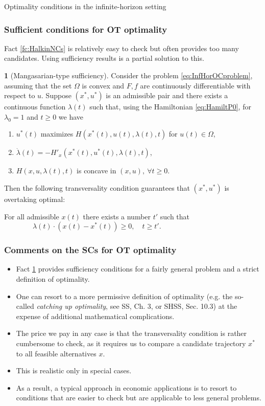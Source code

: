 \documentclass[10pt]{beamer}
\theoremstyle{definition}
\newtheorem{Fact}{\translate{Fact}}
\begin{document}
\begin{section}{Optimality conditions in the infinite-horizon setting}
\begin{frame}[fragile]
\frametitle{Sufficient conditions for OT optimality}
Fact \ref{fc:HalkinNCs} is relatively easy to check but often provides too many candidates. Using sufficiency results is a partial solution to this. \pause

\begin{Fact}[Mangasarian-type sufficiency]
Consider the problem \eqref{eq:InfHorOCproblem}, assuming that the set $ \Omega $ is convex and $ F,f $ are continuously differentiable with respect to $ u $. Suppose $ (x^*,u^*) $ is an admissible pair and there exists a continuous function $ \lambda(t) $ such that, using the Hamiltonian \eqref{eq:HamiltP0}, for $ \lambda_0=1 $ and $ t\geq 0 $ we have
\begin{enumerate}
\item $ u^*(t) $ maximizes $ H(x^*(t),u(t),\lambda(t),t )$ for $ u(t)\in \Omega $,
\item $ \dot{\lambda}(t) = -H'_x(x^*(t),u^*(t),\lambda(t),t) $,
\item $ H(x,u,\lambda(t),t ) $ is concave in $ (x,u),~\forall t \geq 0 $.
\end{enumerate}

Then the following transversality condition guarantees that $ (x^*,u^*) $ is overtaking optimal:

For all admissible $ x(t) $ there exists a number $ t' $ such that \newline
${} \qquad \qquad \lambda(t)\cdot (x(t)-x^*(t))\geq 0,\quad t\geq t'. $ 
\label{fc:SCsOT}
\end{Fact}
\end{frame}

\begin{frame}[fragile]
\frametitle{Comments on the SCs for OT optimality}
\begin{itemize}\itemsep1em
\item Fact \ref{fc:SCsOT} provides sufficiency conditions for a fairly general problem and a strict definition of optimality.
\item One can resort to a more permissive definition of optimality (e.g. the so-called \emph{catching up optimality}, see SS, Ch. 3, or SHSS, Sec. 10.3) at the expense of additional mathematical complications.
\item The price we pay in any case is that the transversality condition is rather cumbersome to check, as it requires us to compare a candidate trajectory $ x^* $ to all feasible alternatives $ x $.
\item This is realistic only in special cases.
\item As a result, a typical approach in economic applications is to resort to conditions that are easier to check but are applicable to less general problems.
\end{itemize}
\end{frame}


\end{section}
\end{document}
